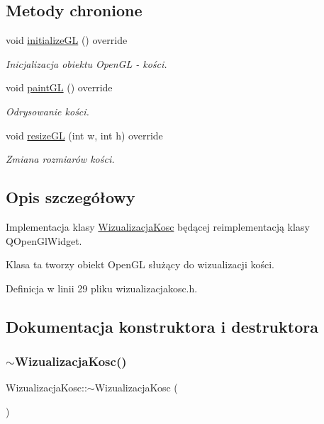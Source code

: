 \subsection*{Metody chronione}
\begin{DoxyCompactItemize}
\item 
void \hyperlink{class_wizualizacja_kosc_aaaef65ae5a984bf54ebfa56069670c5f}{initialize\+GL} () override
\begin{DoxyCompactList}\small\item\em Inicjalizacja obiektu Open\+GL -\/ kości. \end{DoxyCompactList}\item 
void \hyperlink{class_wizualizacja_kosc_a2b5ddee0e92d08a200b1749c4629d71d}{paint\+GL} () override
\begin{DoxyCompactList}\small\item\em Odrysowanie kości. \end{DoxyCompactList}\item 
void \hyperlink{class_wizualizacja_kosc_ad754ad7e1003c4ec6f4f29f126424701}{resize\+GL} (int w, int h) override
\begin{DoxyCompactList}\small\item\em Zmiana rozmiarów kości. \end{DoxyCompactList}\end{DoxyCompactItemize}


\subsection{Opis szczegółowy}
Implementacja klasy \hyperlink{class_wizualizacja_kosc}{Wizualizacja\+Kosc} będącej reimplementacją klasy Q\+Open\+Gl\+Widget. 

Klasa ta tworzy obiekt Open\+GL służący do wizualizacji kości. 

Definicja w linii 29 pliku wizualizacjakosc.\+h.



\subsection{Dokumentacja konstruktora i destruktora}
\mbox{\label{class_wizualizacja_kosc_aa0de8f8ca522fa9e18a7040dc0f4a5f4}} 
\subsubsection{\texorpdfstring{$\sim$\+Wizualizacja\+Kosc()}{~WizualizacjaKosc()}}
{\footnotesize\ttfamily Wizualizacja\+Kosc\+::$\sim$\+Wizualizacja\+Kosc (\begin{DoxyParamCaption}{ }\end{DoxyParamCaption})}



